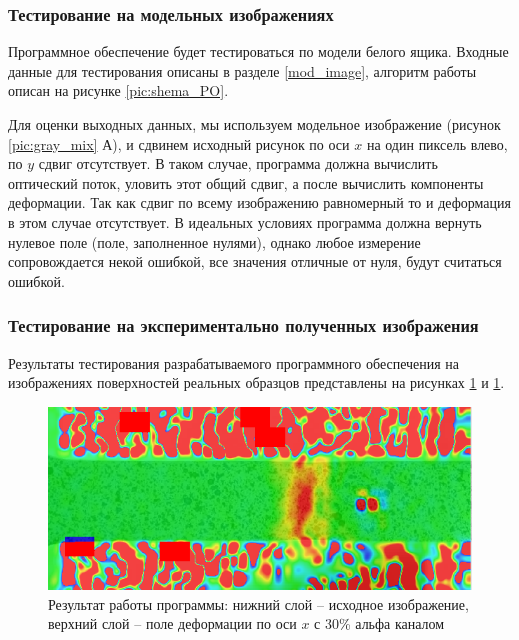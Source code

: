 \subsubsection{Тестирование на модельных изображениях}

Программное обеспечение будет тестироваться по модели белого ящика. Входные данные для тестирования описаны в разделе \ref{mod_image}, алгоритм работы описан на рисунке \ref{pic:shema_PO}.

Для оценки выходных данных, мы используем модельное изображение (рисунок \ref{pic:gray_mix} А), и сдвинем исходный рисунок по оси $x$ на один пиксель влево, по $y$ сдвиг отсутствует.
В таком случае, программа должна вычислить оптический поток, уловить этот общий сдвиг, а после вычислить компоненты деформации. Так как сдвиг по всему изображению равномерный то и деформация в этом случае отсутствует. В идеальных условиях программа должна вернуть нулевое поле (поле, заполненное нулями), однако любое измерение сопровождается некой ошибкой, все значения отличные от нуля, будут считаться ошибкой.

\subsubsection{Тестирование на экспериментально полученных изображения}
Результаты тестирования разрабатываемого программного обеспечения на изображениях поверхностей реальных образцов представлены на рисунках \ref{fig:al_strain} и \ref{fig:al_strain}.

\begin{figure}
\centering
\includegraphics[width=0.7\linewidth]{images/al_strain}
\caption{Результат работы программы: нижний слой -- исходное изображение, верхний слой -- поле деформации по оси $x$ с 30\% альфа каналом}
\label{fig:al_strain}
\end{figure}

